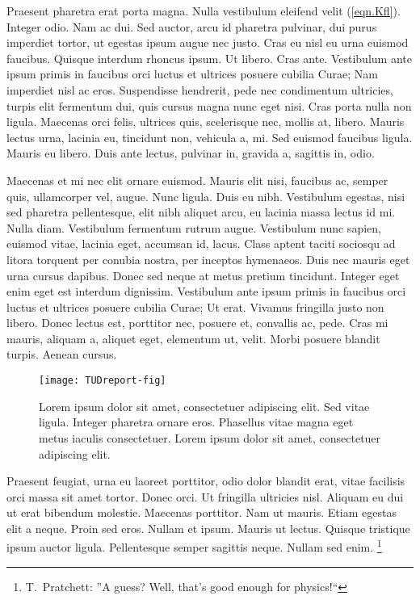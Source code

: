 \documentclass[nochapterpage,nopartpage,numbersubsubsec,bigchapter,colorback,accentcolor=tud9c]{tudreport}
\begin{document}
    Praesent pharetra erat porta magna. Nulla vestibulum eleifend velit (\ref{eqn.Kfl}). Integer odio. Nam ac dui. Sed auctor, arcu id pharetra pulvinar, dui purus imperdiet tortor, ut egestas ipsum augue nec justo. Cras eu nisl eu urna euismod faucibus. Quisque interdum rhoncus ipsum. Ut libero. Cras ante. Vestibulum ante ipsum primis in faucibus orci luctus et ultrices posuere cubilia Curae; Nam imperdiet nisl ac eros. Suspendisse hendrerit, pede nec condimentum ultricies, turpis elit fermentum dui, quis cursus magna nunc eget nisi. Cras porta nulla non ligula. Maecenas orci felis, ultrices quis, scelerisque nec, mollis at, libero. Mauris lectus urna, lacinia eu, tincidunt non, vehicula a, mi. Sed euismod faucibus ligula. Mauris eu libero. Duis ante lectus, pulvinar in, gravida a, sagittis in, odio.

    Maecenas et mi nec elit ornare euismod. Mauris elit nisi, faucibus ac, semper quis, ullamcorper vel, augue. Nunc ligula. Duis eu nibh. Vestibulum egestas, nisi sed pharetra pellentesque, elit nibh aliquet arcu, eu lacinia massa lectus id mi. Nulla diam. Vestibulum fermentum rutrum augue. Vestibulum nunc sapien, euismod vitae, lacinia eget, accumsan id, lacus. Class aptent taciti sociosqu ad litora torquent per conubia nostra, per inceptos hymenaeos. Duis nec mauris eget urna cursus dapibus. Donec sed neque at metus pretium tincidunt. Integer eget enim eget est interdum dignissim. Vestibulum ante ipsum primis in faucibus orci luctus et ultrices posuere cubilia Curae; Ut erat. Vivamus fringilla justo non libero. Donec lectus est, porttitor nec, posuere et, convallis ac, pede. Cras mi mauris, aliquam a, aliquet eget, elementum ut, velit. Morbi posuere blandit turpis. Aenean cursus.
             \begin{figure}
                 \centering
                 \texttt{[image: TUDreport-fig]}
                 \caption[Lorem ipsum dolor sit amet]{Lorem ipsum dolor sit amet, consectetuer adipiscing elit. Sed vitae ligula. Integer pharetra ornare eros. Phasellus vitae magna eget metus iaculis consectetuer. Lorem ipsum dolor sit amet, consectetuer adipiscing elit.}
             \end{figure}

    Praesent feugiat, urna eu laoreet porttitor, odio dolor blandit erat, vitae facilisis orci massa sit amet tortor. Donec orci. Ut fringilla ultricies nisl. Aliquam eu dui ut erat bibendum molestie. Maecenas porttitor. Nam ut mauris. Etiam egestas elit a neque. Proin sed eros. Nullam et ipsum. Mauris ut lectus. Quisque tristique ipsum auctor ligula. Pellentesque semper sagittis neque. Nullam sed enim.%
    \footnote{T.\ Pratchett: ''A guess? Well, that's good enough for physics!{``}}
\end{document}
